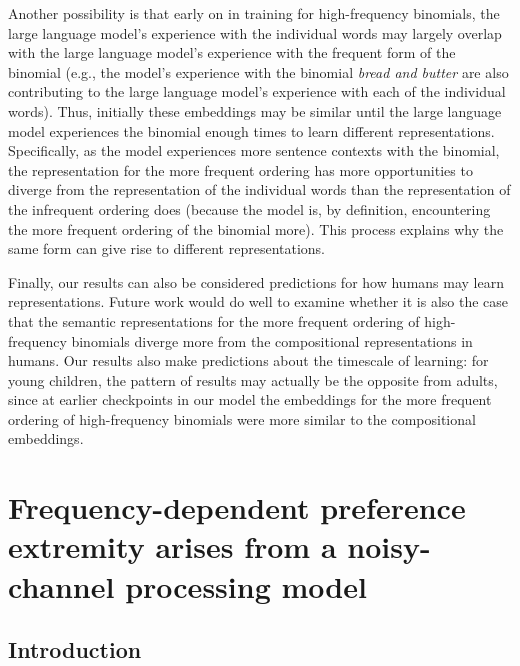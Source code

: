 \documentclass[
  12pt,
  letterpaper,
]{scrreprt}
\begin{document}
Another possibility is that early on in training for high-frequency
binomials, the large language model's experience with the individual
words may largely overlap with the large language model's experience
with the frequent form of the binomial (e.g., the model's experience
with the binomial \emph{bread and butter} are also contributing to the
large language model's experience with each of the individual words).
Thus, initially these embeddings may be similar until the large language
model experiences the binomial enough times to learn different
representations. Specifically, as the model experiences more sentence
contexts with the binomial, the representation for the more frequent
ordering has more opportunities to diverge from the representation of
the individual words than the representation of the infrequent ordering
does (because the model is, by definition, encountering the more
frequent ordering of the binomial more). This process explains why the
same form can give rise to different representations.

Finally, our results can also be considered predictions for how humans
may learn representations. Future work would do well to examine whether
it is also the case that the semantic representations for the more
frequent ordering of high-frequency binomials diverge more from the
compositional representations in humans. Our results also make
predictions about the timescale of learning: for young children, the
pattern of results may actually be the opposite from adults, since at
earlier checkpoints in our model the embeddings for the more frequent
ordering of high-frequency binomials were more similar to the
compositional embeddings.


\chapter{Frequency-dependent preference extremity arises from a
noisy-channel processing
model}\label{frequency-dependent-preference-extremity-arises-from-a-noisy-channel-processing-model}

\section{Introduction}\label{introduction-5}
\end{document}
